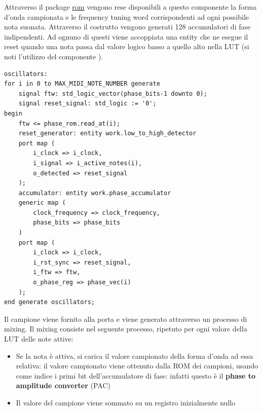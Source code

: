 Attraverso il package \hyperref[sec:rom]{rom} vengono rese disponibili a questo componente la forma d'onda campionata e le frequency
tuning word corrispondenti ad ogni possibile nota suonata.
Attraverso il costrutto  vengono generati 128 accumulatori di fase indipendenti. Ad ognuno di questi viene accoppiata
una entity che ne esegue il reset quando una nota passa dal valore logico basso a quello alto nella LUT
(si noti l'utilizzo del componente \hyperref[sec:lowhigh]{}).
\begin{verbatim}
oscillators:
for i in 0 to MAX_MIDI_NOTE_NUMBER generate
    signal ftw: std_logic_vector(phase_bits-1 downto 0);
    signal reset_signal: std_logic := '0';
begin
    ftw <= phase_rom.read_at(i);
    reset_generator: entity work.low_to_high_detector
    port map (
        i_clock => i_clock,
        i_signal => i_active_notes(i),
        o_detected => reset_signal
    );
    accumulator: entity work.phase_accumulator
    generic map (
        clock_frequency => clock_frequency,
        phase_bits => phase_bits
    )
    port map (
        i_clock => i_clock,
        i_rst_sync => reset_signal,
        i_ftw => ftw,
        o_phase_reg => phase_vec(i)
    );
end generate oscillators;
\end{verbatim}

Il campione viene fornito alla porta  e viene generato attraverso un processo di mixing.
Il mixing consiste nel seguente processo, ripetuto per ogni valore della LUT delle note attive:
\begin{itemize}
    \item Se la nota è attiva, si carica il valore campionato della forma d'onda ad essa relativa:
          il valore campionato viene ottenuto dalla ROM dei campioni, usando come indice
          i primi  bit dell'accumulatore di fase: infatti questo è il
          \textbf{phase to amplitude converter} (PAC)
    \item Il valore del campione viene sommato su un registro inizialmente nullo
\end{itemize} 

